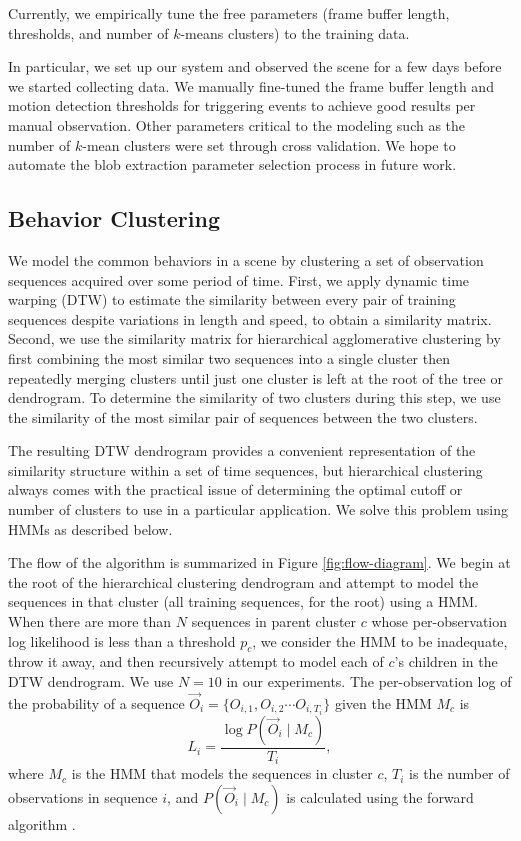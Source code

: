 Currently, we empirically tune the free parameters (frame buffer
length, thresholds, and number of $k$-means clusters) to the training
data. 

In particular, we set up our system and observed the scene for a few 
days before we started collecting data. We manually fine-tuned the frame buffer 
length and motion detection thresholds for triggering events to achieve 
good results per manual observation. Other parameters critical to the 
modeling such as the number of $k$-mean clusters were set through cross 
validation. We hope to automate the blob extraction parameter selection
process in future work.

\subsection{Behavior Clustering}
\label{sec:clustering-behavior-clustering}

We model the common behaviors in a scene by clustering a set of
observation sequences acquired over some period of time. First, we
apply dynamic time warping (DTW) to estimate the similarity between
every pair of training sequences despite variations in length and
speed, to obtain a similarity matrix. Second, we use the similarity
matrix for hierarchical agglomerative clustering by first combining
the most similar two sequences into a single cluster then repeatedly
merging clusters until just one cluster is left at the root of the
tree or dendrogram.  To determine the similarity of two clusters
during this step, we use the similarity of the most similar pair of
sequences between the two clusters.

The resulting DTW dendrogram provides a convenient representation of
the similarity structure within a set of time sequences, but
hierarchical clustering always comes with the practical issue of
determining the optimal cutoff or number of clusters to use in a
particular application.  We solve this problem using HMMs as described
below.

The flow of the algorithm is summarized in
Figure \ref{fig:flow-diagram}.  We begin at the root of the
hierarchical clustering dendrogram and attempt to model the sequences
in that cluster (all training sequences, for the root) using a
HMM. When there are more than $N$ sequences in parent cluster $c$
whose per-observation log likelihood is less than a threshold $p_c$,
we consider the HMM to be inadequate, throw it away, and then
recursively attempt to model each of $c$'s children in the DTW
dendrogram.  We use $N=10$ in our experiments. The per-observation log
of the probability of a sequence $\vec{O}_i = \{ O_{i, 1}, O_{i, 2} \cdots
O_{i, T_i} \}$ given the HMM $M_c$ is
\begin{equation}
    L_{i} = \frac{\log P( \vec{O}_i \mid M_c )}{T_i},
\end{equation}
where $M_c$ is the HMM that models the sequences in cluster $c$, $T_i$
is the number of observations in sequence $i$, and $P(\vec{O}_i
\mid M_c)$ is calculated using the forward algorithm .

